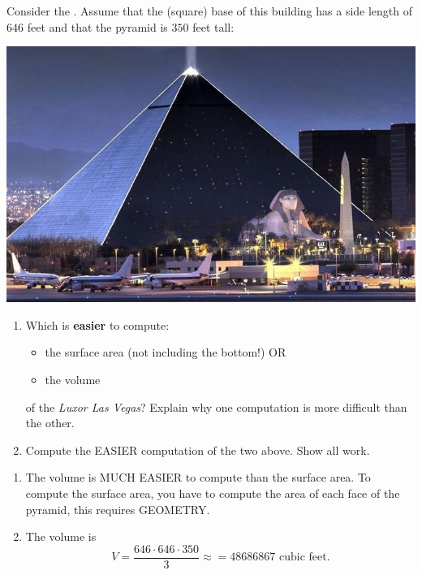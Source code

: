 \documentclass[handout,nooutcomes,noauthor,hints1,12pt]{ximera}
\begin{document}
 \begin{question}   Consider the .  Assume that the (square) base of this building has a side length of
 $646$ feet and that the pyramid is $350$ feet tall:
  \begin{center}
    \includegraphics[width=.4\textwidth]{pyramid.jpg} 
  \end{center}

  \begin{enumerate}
  \item Which is \textbf{easier} to compute:
    \begin{itemize}
    \item the surface area (not including the bottom!) OR
    \item the volume
    \end{itemize}
    of the \textit{Luxor Las Vegas}?
    Explain why one computation is more difficult than the other.
    \item Compute the EASIER computation of the two above. Show all
      work.
  \end{enumerate}

   \begin{freeResponse}
    \begin{enumerate}
      \item The volume is MUCH EASIER to compute than the surface
        area. To compute the surface area, you have to compute the
        area of each face of the pyramid, this requires GEOMETRY.

      \item The volume is
        \[
        V = \frac{646\cdot 646\cdot 350}{3} \approx = 48686867 \text{ cubic feet}.
        \]
    \end{enumerate}
  \end{freeResponse}
\end{question}

\mynewpage
\end{document}
